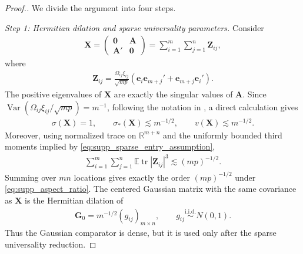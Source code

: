 \documentclass[numsec,webpdf,modern,large,namedate]{oup-authoring-template}
\theoremstyle{plain}
\theoremstyle{remark}
\newif\ifmarkchanges
\newenvironment{revision}{\begingroup\ifmarkchanges\color{red}\fi}{\endgroup}
\begin{document}
\begin{revision}
\begin{proof}[Proof.]
We divide the argument into four steps.

\textit{Step 1: Hermitian dilation and sparse universality parameters.}
Consider
\begin{align*}
    \bm X
    =\begin{pmatrix}
      \bm0&\bm A\\
      \bm A'&\bm0
    \end{pmatrix}
    =\sum_{i=1}^m\sum_{j=1}^n\bm Z_{ij},
\end{align*}
where
\begin{align*}
    \bm Z_{ij}
    =\frac{\Omega_{ij}\xi_{ij}}{\sqrt{mp}}
      (\bm e_i\bm e_{m+j}'+\bm e_{m+j}\bm e_i').
\end{align*}
The positive eigenvalues of $\bm X$ are exactly the singular values of $\bm A$.  Since
$\operatorname{Var}(\Omega_{ij}\xi_{ij}/\sqrt{mp})=m^{-1}$, following the notation in \cite{brailovskaya2024universality}, a direct calculation gives
\begin{align*}
    \sigma(\bm X)=1,\qquad
    \sigma_*(\bm X)\lesssim m^{-1/2},\qquad
    v(\bm X)\lesssim m^{-1/2}.
\end{align*}
Moreover, using normalized trace on $\mathbb R^{m+n}$ and the uniformly bounded third moments implied by \eqref{eq:supp_sparse_entry_assumption},
\begin{align}
\label{eq:supp_sparse_third_trace}
    \sum_{i=1}^m\sum_{j=1}^n
    \mathbb E\operatorname{tr}|\bm Z_{ij}|^3
    \lesssim (mp)^{-1/2}.
\end{align}
Summing over $mn$ locations gives exactly the order $(mp)^{-1/2}$ under \eqref{eq:supp_aspect_ratio}. The centered Gaussian matrix with the same covariance as $\bm X$ is the Hermitian dilation of
\begin{align*}
    \bm G_0=m^{-1/2}(g_{ij})_{m\times n},
    \qquad g_{ij}\stackrel{\mathrm{i.i.d.}}{\sim}N(0,1).
\end{align*}
Thus the Gaussian comparator is dense, but it is used only after the sparse
universality reduction.


\end{proof}
\end{revision}
\end{document}
